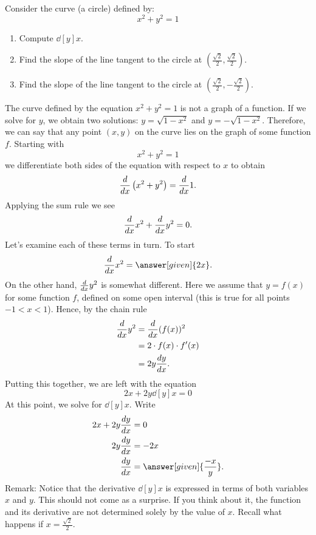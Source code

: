 \documentclass{ximera}
\begin{document}
\begin{example}
Consider the curve (a circle) defined by:
\[
x^2 + y^2 = 1
\]
\begin{enumerate}
\item Compute $\dd[y]{x}$.
\item Find the slope of the line tangent to the circle at $\left(\frac{\sqrt{2}}{2},\frac{\sqrt{2}}{2}\right)$.
\item Find the slope of the line tangent to the circle at $\left(\frac{\sqrt{2}}{2},-\frac{\sqrt{2}}{2}\right)$.
\end{enumerate}
\begin{explanation}

The curve defined by the equation  $x^2 + y^2 = 1$ is not a graph of a function. If we solve for $y$, we obtain two solutions:
$y=\sqrt{1-x^2}$ and $y=-\sqrt{1-x^2}$. Therefore, we can say that  any point $(x,y)$ on the curve lies on the graph of some function $f$.
  Starting with 
\[
x^2 + y^2 = 1
\]
we differentiate both sides of the
equation with respect to $x$ to obtain
\[
\ddx \left(x^2+y^2\right) = \ddx 1.
\]
Applying the sum rule we see
\[
\ddx x^2+\ddx y^2 = 0.
\]
Let's examine each of these terms in turn. To start
\[
\ddx x^2 = \answer[given]{2x}.
\]
On the other hand, $\ddx y^2$ is somewhat different. Here we assume that $y = f(x)$ for some function $f$, defined on some open interval (this is true for all points $-1<x<1$). Hence, by the chain rule
\begin{align*}
\ddx y^2 &= \ddx (f(x))^2 \\ 
&= 2\cdot f(x) \cdot f'(x) \\
&= 2y\dd[y]{x}.
\end{align*}
Putting this together, we are left with the equation
\[
2x + 2y\dd[y]{x} =0
\]
At this point, we solve for $\dd[y]{x}$. Write
\begin{align*}
2x + 2y\dd[y]{x} &= 0\\
2y \dd[y]{x} &= -2x\\
\dd[y]{x} &= \answer[given]{\frac{-x}{y}}.
\end{align*}
Remark: Notice that the derivative $\dd[y]{x} $ is expressed in terms of both variables $x$ and $y$. This should not come as a surprise. If you think about it, the function and  its derivative are not determined solely by the value of $x$. Recall what happens if $x=\frac{\sqrt{2}}{2}$.



\end{explanation}
\end{example}
\end{document}
